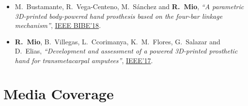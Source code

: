 \documentclass[a4paper,10pt]{article}
\begin{document}
\begin{itemize}
  \item M.\ Bustamante, R.\ Vega-Centeno, M.\ S\'anchez and \textbf{R.\ Mio},
        \textit{``A parametric 3D-printed body-powered hand prosthesis based on the four-bar
        linkage mechanism''},
        \href{https://ieeexplore.ieee.org/document/8567461}{IEEE BIBE'18}.

  \item \textbf{R.\ Mio}, B.\ Villegas, L.\ Ccorimanya, K.\ M.\ Flores, G.\ Salazar and
        D.\ Elias,
        \textit{``Development and assessment of a powered 3D-printed prosthetic hand for
        transmetacarpal amputees''},
        \href{https://ieeexplore.ieee.org/document/7942665/}{IEEE'17}.
\end{itemize}

\section{Media Coverage}
\end{document}
